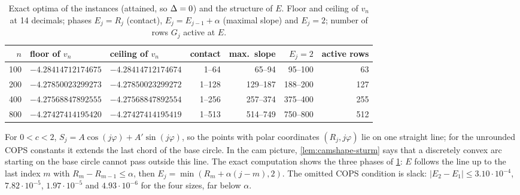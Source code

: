 \begin{table}[ht]
\centering
\small
\caption{Exact optima of the  instances (attained, so $\Delta = 0$) and the structure of $E$. Floor and ceiling of $v_n$ at 14 decimals; phases $E_j = R_j$ (contact), $E_j = E_{j-1} + \alpha$ (maximal slope) and $E_j = 2$; number of rows $G_j$ active at $E$.}
\label{tab:camshape-values}
\begin{tabular}{@{}rllrrrr@{}}
\toprule
$n$ & floor of $v_n$ & ceiling of $v_n$ & contact & max.\ slope & $E_j = 2$ & active rows \\
\midrule
100 & $-4.28414712174675$ & $-4.28414712174674$ & 1--64 & 65--94 & 95--100 & 63 \\
200 & $-4.27850023299273$ & $-4.27850023299272$ & 1--128 & 129--187 & 188--200 & 127 \\
400 & $-4.27568847892555$ & $-4.27568847892554$ & 1--256 & 257--374 & 375--400 & 255 \\
800 & $-4.27427414195420$ & $-4.27427414195419$ & 1--513 & 514--749 & 750--800 & 512 \\
\bottomrule
\end{tabular}
\end{table}

For $0 < c < 2$, $S_j = A\cos(j\varphi) + A'\sin(j\varphi)$, so the points with polar coordinates $(R_j, j\varphi)$ lie on one straight line; for the unrounded COPS constants it extends the last chord of the base circle.
In the cam picture, \cref{lem:camshape-sturm} says that a discretely convex arc starting on the base circle cannot pass outside this line.
The exact computation shows the three phases of \cref{tab:camshape-values}: $E$ follows the line up to the last index $m$ with $R_m - R_{m-1} \le \alpha$, then $E_j = \min(R_m + \alpha(j-m), 2)$.
The omitted COPS condition is slack: $|E_2 - E_1| \le 3.10\cdot10^{-4}$, $7.82\cdot10^{-5}$, $1.97\cdot10^{-5}$ and $4.93\cdot10^{-6}$ for the four sizes, far below $\alpha$.

\begin{certbox}
\end{certbox}

